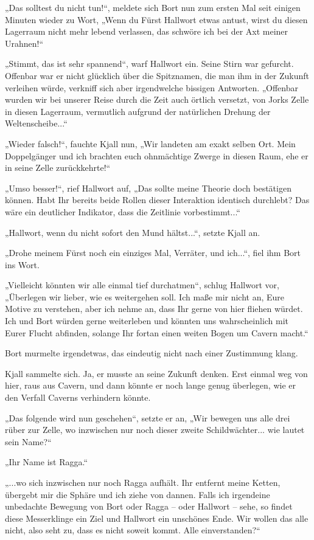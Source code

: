 „Das solltest du nicht tun!“, meldete sich Bort nun zum ersten Mal seit einigen Minuten wieder zu Wort, „Wenn du Fürst Hallwort etwas antust, wirst du diesen Lagerraum nicht mehr lebend verlassen, das schwöre ich bei der Axt meiner Urahnen!“

„Stimmt, das ist sehr spannend“, warf Hallwort ein. Seine Stirn war gefurcht. Offenbar war er nicht glücklich über die Spitznamen, die man ihm in der Zukunft verleihen würde, verkniff sich aber irgendwelche bissigen Antworten. „Offenbar wurden wir bei unserer Reise durch die Zeit auch örtlich versetzt, von Jorks Zelle in diesen Lagerraum, vermutlich aufgrund der natürlichen Drehung der Weltenscheibe...“

„Wieder falsch!“, fauchte Kjall nun, „Wir landeten am exakt selben Ort. Mein Doppelgänger und ich brachten euch ohnmächtige Zwerge in diesen Raum, ehe er in seine Zelle zurückkehrte!“

„Umso besser!“, rief Hallwort auf, „Das sollte meine Theorie doch bestätigen können. Habt Ihr bereits beide Rollen dieser Interaktion identisch durchlebt? Das wäre ein deutlicher Indikator, dass die Zeitlinie vorbestimmt...“

„Hallwort, wenn du nicht sofort den Mund hältst...“, setzte Kjall an.

„Drohe meinem Fürst noch ein einziges Mal, Verräter, und ich...“, fiel ihm Bort ins Wort.

„Vielleicht könnten wir alle einmal tief durchatmen“, schlug Hallwort vor, „Überlegen wir lieber, wie es weitergehen soll. Ich maße mir nicht an, Eure Motive zu verstehen, aber ich nehme an, dass Ihr gerne von hier fliehen würdet. Ich und Bort würden gerne weiterleben und könnten uns wahrscheinlich mit Eurer Flucht abfinden, solange Ihr fortan einen weiten Bogen um Cavern macht.“

Bort murmelte irgendetwas, das eindeutig nicht nach einer Zustimmung klang.

Kjall sammelte sich. Ja, er musste an seine Zukunft denken. Erst einmal weg von hier, raus aus Cavern, und dann könnte er noch lange genug überlegen, wie er den Verfall Caverns verhindern könnte.

„Das folgende wird nun geschehen“, setzte er an, „Wir bewegen uns alle drei rüber zur Zelle, wo inzwischen nur noch dieser zweite Schildwächter... wie lautet sein Name?“

„Ihr Name ist Ragga.“

„...wo sich inzwischen nur noch Ragga aufhält. Ihr entfernt meine Ketten, übergebt mir die Sphäre und ich ziehe von dannen. Falls ich irgendeine unbedachte Bewegung von Bort oder Ragga – oder Hallwort – sehe, so findet diese Messerklinge ein Ziel und Hallwort ein unschönes Ende. Wir wollen das alle nicht, also seht zu, dass es nicht soweit kommt. Alle einverstanden?“

